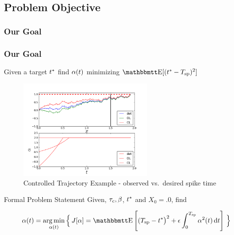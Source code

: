 \documentclass{beamer}
\begin{document}
\subsection{Problem Objective}
\begin{frame}
\frametitle{Our Goal}
\end{frame}

\begin{frame}
\frametitle{Our Goal}

Given a target ${ t^* }$ find ${\alpha}(t)$ minimizing $\Exp[(\T - \ts)^2]$
\begin{figure}
\begin{center}
\includegraphics[width=0.6\textwidth]
{Figs/ControlSimulator/DesiredVsRealized_Tsp}
\caption{ Controlled Trajectory Example
- observed vs.\ desired spike time 
}
\end{center}
\end{figure}

\end{frame}


\begin{frame}

\begin{block}{Formal Problem Statement}
Given, ${ \tau_{c} }, {\beta}$, ${ t^* }$ and $X_0 = .0$, find

\begin{equation}
\a(t) = \argmin_{\a(t)} \Big\{ \, J[\a] = 
\Exp\left[
(\ts - \T \big)^2 
+  
\e \int_0^\ts  \a^2(t) \intd{t}  \right]
\, \Big\}
\end{equation}
\end{block}
\end{frame}
\end{document}
